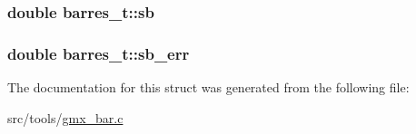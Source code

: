 \hypertarget{structbarres__t_a016d7cb86e6adedd83d12063b1bc6e70}{
\subsubsection[{sb}]{\setlength{\rightskip}{0pt plus 5cm}double {\bf barres\-\_\-t\-::sb}}}\label{structbarres__t_a016d7cb86e6adedd83d12063b1bc6e70}
\hypertarget{structbarres__t_a0db5f10ddb3f16c1693156e9f2042b16}{
\subsubsection[{sb\-\_\-err}]{\setlength{\rightskip}{0pt plus 5cm}double {\bf barres\-\_\-t\-::sb\-\_\-err}}}\label{structbarres__t_a0db5f10ddb3f16c1693156e9f2042b16}


\-The documentation for this struct was generated from the following file\-:\begin{DoxyCompactItemize}
\item 
src/tools/\hyperlink{gmx__bar_8c}{gmx\-\_\-bar.\-c}\end{DoxyCompactItemize}

